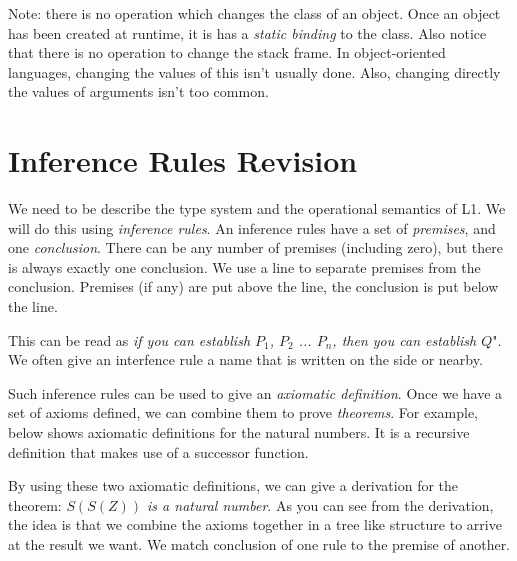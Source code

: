 


Note: there is no operation which changes the class of an object.
Once an object has been created at runtime, it is has a \textit{static binding}
to the class. Also notice that there is no operation to change the stack frame.
In object-oriented languages, changing the values of this isn't usually done.
Also, changing directly the values of arguments isn't too common. 



\section{Inference Rules Revision}

We need to be describe the type system and the operational semantics of L1.
We will do this using \textit{inference rules}. An
inference rules have a set of \textit{premises}, and one \textit{conclusion}.
There can be any number of premises (including zero), 
but there is always exactly one conclusion. 
We use a line to separate premises from the conclusion. 
Premises (if any) are put above the line, the conclusion is put below the line.


This can be read as \textit{if you can establish $P_1$, $P_2$ ... $P_n$, 
then you can establish $Q$}". We often give an interfence rule a name 
that is written on the side or nearby.

Such inference rules can be used to give an \textit{axiomatic deﬁnition}.
Once we have a set of axioms defined, we can combine 
them to prove \textit{theorems}. For example, below shows 
axiomatic definitions for the natural numbers. 
It is a recursive definition that makes use of a successor function.

{}

{}

By using these two axiomatic definitions, we
can give a derivation for the theorem: \textit{$S(S(Z))$ is a natural number}.
As you can see from the derivation, the idea is that we combine the axioms 
together in a tree like structure to arrive at the result we want. 
We match conclusion of one rule to the premise of another. 

